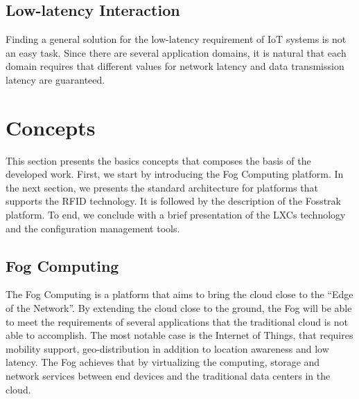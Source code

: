 \subsection{Low-latency Interaction}
\label{sub:low_latency_interaction}
Finding a general solution for the low-latency requirement of \gls{IoT} systems is not an easy task.
Since there are several application domains, it is natural that each domain requires that different
values for network latency and data transmission latency are guaranteed.

\section{Concepts}
\label{sec:Concepts}
This section presents the basics concepts that composes the basis of the developed work. First, we
start by introducing the Fog Computing platform. In the next section, we presents the standard architecture
for platforms that supports the \gls{RFID} technology. It is followed by the description of the
Fosstrak platform. To end, we conclude with a brief presentation of the \glspl{LXC} technology and
the configuration management tools.

\subsection{Fog Computing}
\label{sub:fog_computing}
The Fog Computing \cite{bonomi2012fog} is a platform that aims to bring the cloud close to the ``Edge
of the Network''. By extending the cloud close to the ground, the Fog will be able to meet the requirements
of several applications that the traditional cloud is not able to accomplish. The most notable case
is the Internet of Things, that requires mobility support, geo-distribution in addition to location
awareness and low latency. The Fog achieves that by virtualizing the computing, storage and network
services between end devices and the traditional data centers in the cloud.\\

